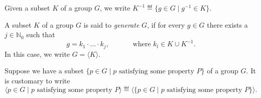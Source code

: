 \documentclass[a4paper, oneside, 12pt]{amsart}
\begin{document}
Given a subset \(K\) of a group \(G\), we write \(K^{-1} \eqdef \{g\in G \mid g^{-1}\in K\}\).

\begin{definition}\label{def:generators}
  A subset \(K\)  of a group \(G\) is said to \emph{generate} \(G\), if for every \(g \in G\) there exists a \(j\in \mathbb{N}_{0}\) such that
  \begin{equation*}
    g = k_{1} \cdot \dotsc \cdot k_{j}, \qquad\quad \text{ where } k_{l} \in K \cup K^{-1}.
  \end{equation*}
  In this case, we write \(G = \langle K \rangle\).
\end{definition}

Suppose we have a subset \(\{p \in G \mid p \text{ satisfying some property }P \}\) of a group \(G\).
It is customary to write
\begin{equation*}
  \langle p \in G \mid p \text{ satisfying some property }P \rangle \eqdef \langle \{p \in G \mid p \text{ satisfying some property }P \}\rangle.
\end{equation*}
\end{document}
